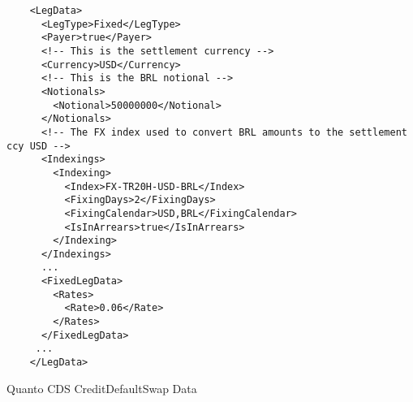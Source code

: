 \begin{listing}[H]
\begin{verbatim}
    <LegData>
      <LegType>Fixed</LegType>
      <Payer>true</Payer>
      <!-- This is the settlement currency -->
      <Currency>USD</Currency>
      <!-- This is the BRL notional -->
      <Notionals>
        <Notional>50000000</Notional>
      </Notionals>
      <!-- The FX index used to convert BRL amounts to the settlement ccy USD -->
      <Indexings>
        <Indexing>
          <Index>FX-TR20H-USD-BRL</Index>
          <FixingDays>2</FixingDays>
          <FixingCalendar>USD,BRL</FixingCalendar>
          <IsInArrears>true</IsInArrears>
        </Indexing>
      </Indexings>
      ...
      <FixedLegData>
        <Rates>
          <Rate>0.06</Rate>
        </Rates>
      </FixedLegData>
     ...
    </LegData>
\end{verbatim}
\caption{Quanto CDS CreditDefaultSwap Data}
\label{lst:quanto_cds}
\end{listing}
